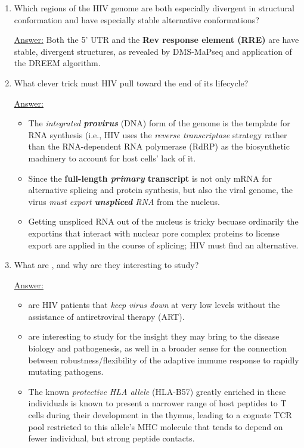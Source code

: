 \documentclass{article}
\newenvironment{QandA}{\begin{enumerate}[label=\bfseries Q\arabic*.]}
                       {\end{enumerate}}
\newenvironment{answered}{\par\normalfont\underline{Answer:}}{}
\begin{document}
\begin{QandA}
\begin{answered}
\begin{itemize}
    \end{itemize}
    \end{answered}
  \item{Which regions of the HIV genome are both especially divergent in structural conformation and have especially stable alternative conformations?}
    \begin{answered}
    Both the 5' UTR and the \textbf{Rev response element (RRE)} are have stable, divergent structures, as revealed by DMS-MaPseq and application of the DREEM algorithm.
    \end{answered}
  \item{What clever trick must HIV pull toward the end of its lifecycle?}
    \begin{answered}
    \begin{itemize}
      \item{The \textit{integrated \textbf{provirus}} (DNA) form of the genome is the template for RNA synthesis (i.e., HIV uses the \textit{reverse transcriptase} strategy rather than the RNA-dependent RNA polymerase (RdRP) as the biosynthetic machinery to account for host cells' lack of it.}
      \item{Since the \textbf{full-length \textit{primary} transcript} is not only mRNA for alternative splicing and protein synthesis, but also the viral genome, the virus \textit{must export \textbf{unspliced} RNA} from the nucleus.}
      \item{Getting unspliced RNA out of the nucleus is tricky becuase ordinarily the exportins that interact with nuclear pore complex proteins to license export are applied in the course of splicing; HIV must find an alternative.}
    \end{itemize}
    \end{answered}
  \item{What are , and why are they interesting to study?}
    \begin{answered}
    \begin{itemize}
      \item{ are HIV patients that \textit{keep virus down} at very low levels without the assistance of antiretroviral therapy (ART).}
      \item{ are interesting to study for the insight they may bring to the disease biology and pathogenesis, as well in a broader sense for the connection between robustness/flexibility of the adaptive immune response to rapidly mutating pathogens.}
      \item{The known \textit{protective HLA allele} (HLA-B57) greatly enriched in these individuals is known to present a narrower range of host peptides to T cells during their development in the thymus, leading to a cognate TCR pool restricted to this allele's MHC molecule that tends to depend on fewer individual, but strong peptide contacts.}
    \end{itemize}
    \end{answered}
\end{QandA}
\end{document}
